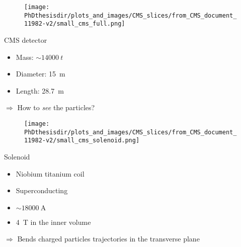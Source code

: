 \begin{frame}
\begin{minipage}[t]{.6\textwidth}
\begin{figure}
\texttt{[image: \\PhDthesisdir/plots\_and\_images/CMS\_slices/from\_CMS\_document\_11982-v2/small\_cms\_full.png]}
\end{figure}
\end{minipage}
\hfill\begin{minipage}[t]{.35\textwidth}
\begin{block}{CMS detector}
\begin{itemize}
\item Mass: $\sim\SI{14000}{t}$
\item Diameter: \SI{15}{\meter}
\item Length: \SI{28.7}{\meter}
\end{itemize}
\end{block}

\begin{block}{}
$\Rightarrow$ How to \emph{see} the particles?
\end{block}
\end{minipage}
\end{frame}

\begin{frame}
\addtocounter{framenumber}{-1}
\begin{minipage}[t]{.6\textwidth}
\begin{figure}
\texttt{[image: \\PhDthesisdir/plots\_and\_images/CMS\_slices/from\_CMS\_document\_11982-v2/small\_cms\_solenoid.png]}
\end{figure}
\end{minipage}
\hfill\begin{minipage}[t]{.35\textwidth}
\begin{block}{Solenoid}
\begin{itemize}
\item Niobium titanium coil
\item Superconducting
\item $\sim\SI{18000}{\ampere}$
\item \SI{4}{\tesla} in the inner volume
\end{itemize}
\end{block}

\begin{block}{}
$\Rightarrow$ Bends charged particles trajectories in the transverse plane
\end{block}
\end{minipage}
\end{frame}

